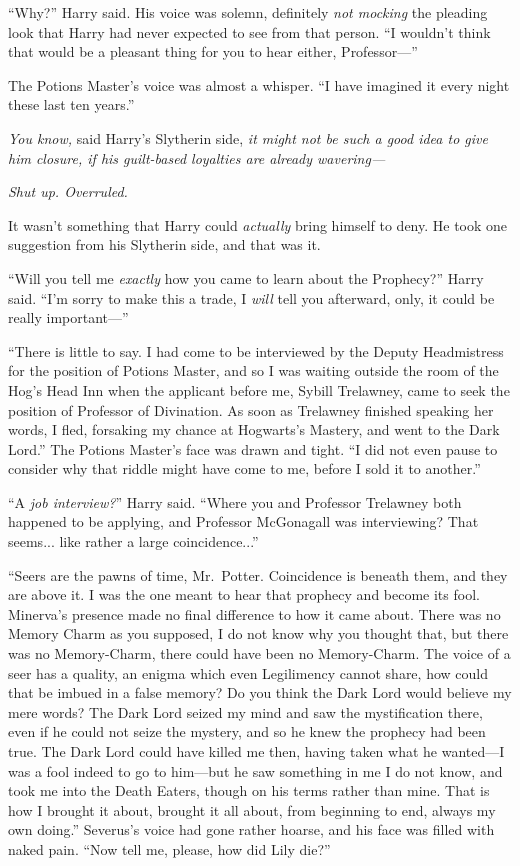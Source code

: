 “Why?” Harry said. His voice was solemn, definitely \emph{not mocking} the pleading look that Harry had never expected to see from that person. “I wouldn’t think that would be a pleasant thing for you to hear either, Professor—”

The Potions Master’s voice was almost a whisper. “I have imagined it every night these last ten years.”

\emph{You know,} said Harry’s Slytherin side, \emph{it might not be such a good idea to give him closure, if his guilt-based loyalties are already wavering—}

\emph{Shut up. Overruled.}

It wasn’t something that Harry could \emph{actually} bring himself to deny. He took one suggestion from his Slytherin side, and that was it.

“Will you tell me \emph{exactly} how you came to learn about the Prophecy?” Harry said. “I’m sorry to make this a trade, I \emph{will} tell you afterward, only, it could be really important—”

“There is little to say. I had come to be interviewed by the Deputy Headmistress for the position of Potions Master, and so I was waiting outside the room of the Hog’s Head Inn when the applicant before me, Sybill Trelawney, came to seek the position of Professor of Divination. As soon as Trelawney finished speaking her words, I fled, forsaking my chance at Hogwarts’s Mastery, and went to the Dark Lord.” The Potions Master’s face was drawn and tight. “I did not even pause to consider why that riddle might have come to me, before I sold it to another.”

“A \emph{job interview?}” Harry said. “Where you and Professor Trelawney both happened to be applying, and Professor McGonagall was interviewing? That seems... like rather a large coincidence...”

“Seers are the pawns of time, Mr.~Potter. Coincidence is beneath them, and they are above it. I was the one meant to hear that prophecy and become its fool. Minerva’s presence made no final difference to how it came about. There was no Memory Charm as you supposed, I do not know why you thought that, but there was no Memory-Charm, there could have been no Memory-Charm. The voice of a seer has a quality, an enigma which even Legilimency cannot share, how could that be imbued in a false memory? Do you think the Dark Lord would believe my mere words? The Dark Lord seized my mind and saw the mystification there, even if he could not seize the mystery, and so he knew the prophecy had been true. The Dark Lord could have killed me then, having taken what he wanted—I was a fool indeed to go to him—but he saw something in me I do not know, and took me into the Death Eaters, though on his terms rather than mine. That is how I brought it about, brought it all about, from beginning to end, always my own doing.” Severus’s voice had gone rather hoarse, and his face was filled with naked pain. “Now tell me, please, how did Lily die?”

